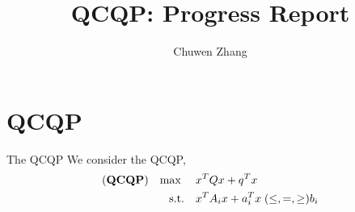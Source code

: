 \documentclass[aspectratio=1610, 9pt]{beamer}
\newcommand{\model}[1]{(\textbf{#1})}
\newcommand{\mx}{\mathbf{\max}\;}
\begin{document}
\title{QCQP: Progress Report}

\author{
  Chuwen Zhang
}
\maketitle

\section{QCQP}
\begin{frame}{The QCQP}
  We consider the QCQP,
  \begin{equation}
    \label{eq:inhoqcqp}
    \begin{aligned}
      \model{QCQP} \quad \mx \quad & x^T Qx + q^T x                                        \\
      \textrm{s.t.} \quad          & x^T A_i x + a_i^T x \hspace{0.27em} (\le, =, \ge) b_i \\
    \end{aligned}
  \end{equation}
\end{frame}
\end{document}
